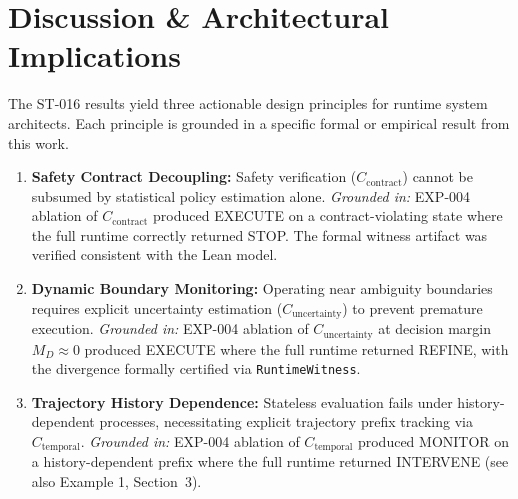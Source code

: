 \section{Discussion \& Architectural Implications}

The ST-016 results yield three actionable design principles for runtime system
architects. Each principle is grounded in a specific formal or empirical result
from this work.

\begin{enumerate}
    \item \textbf{Safety Contract Decoupling:} Safety verification
    ($C_{\text{contract}}$) cannot be subsumed by statistical policy estimation
    alone. \emph{Grounded in:} EXP-004 ablation of $C_{\text{contract}}$ produced
    EXECUTE on a contract-violating state where the full runtime correctly returned
    STOP. The formal witness artifact was verified consistent with the Lean model.

    \item \textbf{Dynamic Boundary Monitoring:} Operating near ambiguity boundaries
    requires explicit uncertainty estimation ($C_{\text{uncertainty}}$) to prevent
    premature execution. \emph{Grounded in:} EXP-004 ablation of $C_{\text{uncertainty}}$
    at decision margin $M_D \approx 0$ produced EXECUTE where the full runtime
    returned REFINE, with the divergence formally certified via \texttt{RuntimeWitness}.

    \item \textbf{Trajectory History Dependence:} Stateless evaluation fails under
    history-dependent processes, necessitating explicit trajectory prefix tracking
    via $C_{\text{temporal}}$. \emph{Grounded in:} EXP-004 ablation of
    $C_{\text{temporal}}$ produced MONITOR on a history-dependent prefix where
    the full runtime returned INTERVENE (see also Example 1, Section~3).
\end{enumerate}

